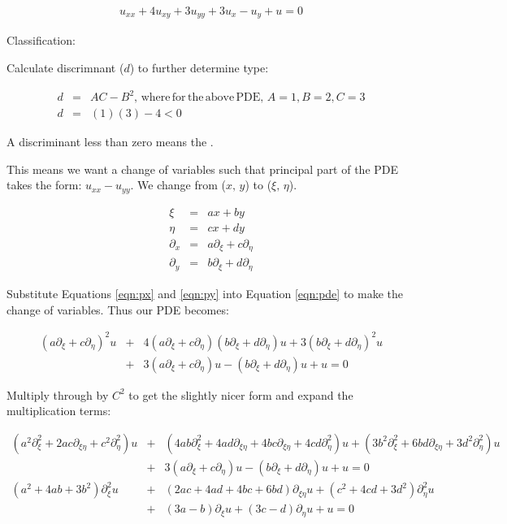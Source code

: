 \documentclass[a4paper,12pt]{article}
\begin{document}
\begin{eqnarray}
u_{xx} + 4u_{xy} + 3u_{yy} + 3u_x - u_y + u = 0 
\label{eqn:pde}
\end{eqnarray}

Classification: 

Calculate discrimnant ($d$) to further determine type:

\begin{eqnarray}
d &=& AC - B^2,\mathrm{\, where\, for\, the\, above\, PDE,\, } A = 1, B = 2, C = 3\nonumber\\
d &=& (1)(3) - 4 < 0\nonumber
\end{eqnarray}

A discriminant less than zero means the .

This means we want a change of variables such that principal part of the PDE takes the form: $u_{xx} - u_{yy}$. We change from ($x,\,y$) to ($\xi,\,\eta$).

\begin{eqnarray}
\xi &=& ax + by\nonumber\\
\eta &=& cx + dy\nonumber\\
\label{eqn:px}
\partial_x &=& a\partial_{\xi} + c\partial_{\eta}\\
\partial_y &=& b\partial_{\xi} + d\partial_{\eta}
\label{eqn:py}
\end{eqnarray}

Substitute Equations \ref{eqn:px} and \ref{eqn:py} into Equation \ref{eqn:pde} to make the change of variables. Thus our PDE becomes:

\begin{eqnarray}
(a\partial_{\xi} + c\partial_{\eta})^2u &+& 4(a\partial_{\xi} + c\partial_{\eta})(b\partial_{\xi} + d\partial_{\eta})u + 3(b\partial_{\xi} + d\partial_{\eta})^2u\nonumber\\ &+& 3(a\partial_{\xi} + c\partial_{\eta})u - (b\partial_{\xi} + d\partial_{\eta})u + u = 0\nonumber
\end{eqnarray}

Multiply through by $C^2$ to get the slightly nicer form and expand the multiplication terms:

\begin{eqnarray}
(a^2\partial_{\xi}^2 + 2ac\partial_{\xi\eta} + c^2\partial_{\eta}^2)u &+& (4ab\partial_{\xi}^2 + 4ad\partial_{\xi\eta} + 4bc\partial_{\xi\eta} + 4cd\partial_{\eta}^2)u + (3b^2\partial_{\xi}^2 + 6bd\partial_{\xi\eta} + 3d^2\partial_{\eta}^2)u\nonumber\\ &+& 3(a\partial_{\xi} + c\partial_{\eta})u - (b\partial_{\xi} + d\partial_{\eta})u + u = 0\nonumber
\nonumber\\
(a^2 + 4ab + 3b^2)\partial_{\xi}^2u &+& (2ac+4ad+4bc+6bd)\partial_{\xi\eta}u + (c^2 + 4cd + 3d^2)\partial_{\eta}^2u\nonumber\\
&+& (3a-b)\partial_{\xi}u + (3c - d)\partial_{\eta}u + u = 0\nonumber
\end{eqnarray}
\end{document}
